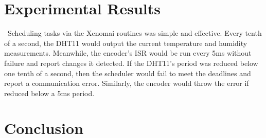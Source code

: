 \documentclass[letterpaper, 12pt]{article}
\begin{document}
\section{Experimental Results}
~\indent Scheduling tasks via the Xenomai routines was simple and effective.  Every tenth of a second, the DHT11 would output the current temperature and humidity measurements.  Meanwhile, the encoder's ISR would be run every 5ms without failure and report changes it detected.  If the DHT11's period was reduced below one tenth of a second, then the scheduler would fail to meet the deadlines and report a communication error.  Similarly, the encoder would throw the error if reduced below a 5ms period.  

\section{Conclusion}

~\newpage
\printbibliography
~\newpage
%
\end{document}
